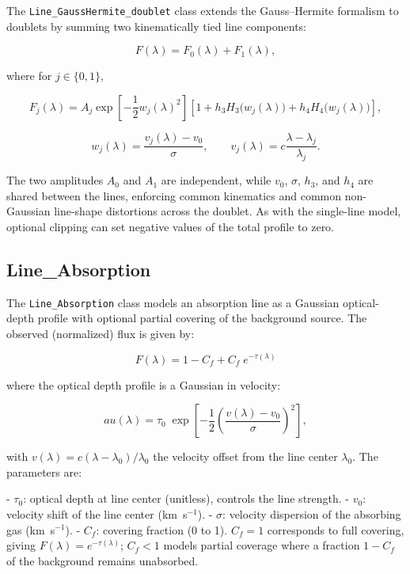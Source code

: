 \documentclass[11pt]{article}
\begin{document}
The \texttt{Line\_GaussHermite\_doublet} class extends the Gauss--Hermite formalism to doublets by summing two kinematically tied line components:

\begin{equation}
F(\lambda)=F_0(\lambda)+F_1(\lambda),
\end{equation}

where for $j\in\{0,1\}$,

\begin{equation}
F_j(\lambda)=A_j\exp\left[-\frac{1}{2}w_j(\lambda)^2\right]\left[1+h_3H_3\big(w_j(\lambda)\big)+h_4H_4\big(w_j(\lambda)\big)\right],
\end{equation}

\begin{equation}
w_j(\lambda)=\frac{v_j(\lambda)-v_0}{\sigma},
\qquad
v_j(\lambda)=c\frac{\lambda-\lambda_j}{\lambda_j}.
\end{equation}

The two amplitudes $A_0$ and $A_1$ are independent, while $v_0$, $\sigma$, $h_3$, and $h_4$ are shared between the lines, enforcing common kinematics and common non-Gaussian line-shape distortions across the doublet. As with the single-line model, optional clipping can set negative values of the total profile to zero.

\subsection{Line\_Absorption}

The \texttt{Line\_Absorption} class models an absorption line as a Gaussian optical-depth profile with optional partial covering of the background source. The observed (normalized) flux is given by:

\begin{equation}
F(\lambda) = 1 - C_f + C_f \; e^{-\tau(\lambda)}
\end{equation}

where the optical depth profile is a Gaussian in velocity:

\begin{equation}
	au(\lambda) = \tau_0 \; \exp\left[-\frac{1}{2}\left(\frac{v(\lambda) - v_0}{\sigma}\right)^2\right],
\end{equation}

with $v(\lambda) = c(\lambda - \lambda_0)/\lambda_0$ the velocity offset from the line center $\lambda_0$. The parameters are:

- $\tau_0$: optical depth at line center (unitless), controls the line strength.
- $v_0$: velocity shift of the line center (km~s$^{-1}$).
- $\sigma$: velocity dispersion of the absorbing gas (km~s$^{-1}$).
- $C_f$: covering fraction (0 to 1). $C_f = 1$ corresponds to full covering, giving $F(\lambda)=e^{-\tau(\lambda)}$; $C_f<1$ models partial coverage where a fraction $1-C_f$ of the background remains unabsorbed.
\end{document}
